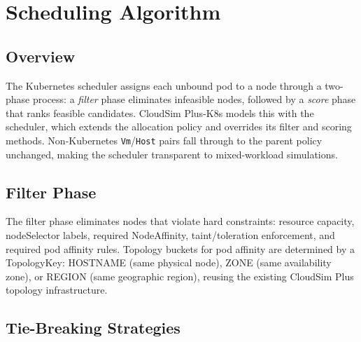 \documentclass[ASNA,twocolumn]{USG}
\newcommand{\ckm}{CloudSim Plus-K8s\xspace}
\begin{document}
    \section{Scheduling Algorithm}\label{sec:scheduling}

    \subsection{Overview}

    The Kubernetes scheduler assigns each unbound pod to a node through a
    two-phase process: a \emph{filter} phase eliminates infeasible nodes,
    followed by a \emph{score} phase that ranks feasible candidates.
    \ckm models this with the scheduler, which extends the allocation
    policy and overrides its filter and scoring methods. Non-Kubernetes
    \texttt{Vm}/\texttt{Host} pairs fall through to the parent policy
    unchanged, making the scheduler transparent to mixed-workload
    simulations.

    \subsection{Filter Phase}

    The filter phase eliminates nodes that violate hard constraints:
    resource capacity, nodeSelector labels, required NodeAffinity,
    taint/toleration enforcement, and required pod affinity rules.
    Topology buckets for pod affinity are determined by a TopologyKey:
    HOSTNAME (same physical node), ZONE (same availability zone), or
    REGION (same geographic region), reusing the existing CloudSim Plus
    topology infrastructure.

    \subsection{Tie-Breaking Strategies}\label{sec:tie-break}
\end{document}
